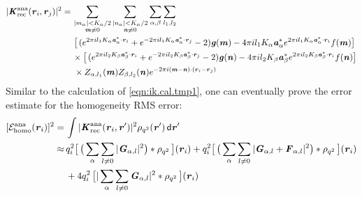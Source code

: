 \documentclass[aps,pre,preprint]{revtex4}
\renewcommand{\v}[1]{\textbf{\textit{#1}}}
\renewcommand{\d}[1]{\textsf{#1}}
\begin{document}
\begin{align}
  \vert\v K^{\textrm{ana}}_{\textrm{rec}}(\v r_i,\v r_j)\vert^2
  =\,&
  \sum_{
    \begin{subarray}{c}
      \vert m_{\alpha}\vert < K_\alpha/2\\
      \v m\neq 0
    \end{subarray}}
  \sum_{
    \begin{subarray}{c}
      \vert n_{\alpha}\vert < K_\alpha/2\\
      \v n\neq 0
    \end{subarray}}
  \sum_{\alpha,\beta}
  \sum_{l_1,l_2}
  \\\nonumber
  &\,
  \big[
  \,(
  e^{2\pi i l_1 K_\alpha\v a^\ast_\alpha\cdot \v r_i} +
  e^{-2\pi i l_1 K_\alpha\v a^\ast_\alpha\cdot \v r_j}
  - 2
  )
  \v g(\v m)
  - 4\pi i l_1 K_\alpha\v a_\alpha^\ast e^{2\pi i l_1 K_\alpha\v a^\ast_\alpha\cdot \v r_i}
  f(\v m)
  \big] \\\nonumber
  \,&
  \times
  \big[
  \,(
  e^{2\pi i l_2 K_\beta\v a^\ast_\beta\cdot \v r_i} +
  e^{-2\pi i l_2 K_\beta\v a^\ast_\beta\cdot \v r_j}
  - 2
  )
  \v g(\v n)
  - 4\pi i l_2 K_\beta\v a_\beta^\ast e^{2\pi i l_2 K_\beta\v a^\ast_\beta\cdot \v r_i}
  f(\v n)
  \big]
  \\
  &\,
  \times
  Z_{\alpha,l_1}(\v m)Z_{\beta,l_2}(\v n)
  e^{-2\pi i(\v m-\v n)\cdot(\v r_i-\v r_j)}
\end{align}
Similar to the calculation of \eqref{eqn:ik.cal.tmp1}, one can eventually
prove the error estimate for the homogeneity RMS error:
\begin{align}\nonumber
  [\mathcal E^{\textrm{ana}}_{\textrm{homo}}(\v r_i)]^2
  = \,&
  \int
  \vert\v K^{\textrm{ana}}_{\textrm{rec}}(\v r_i,\v r')\vert^2
  \rho_{q^2}(\v r')\,\d d\v r' \\\nonumber
  \approx\,&  
  q_i^2
  \big[\,
  \big(
  \sum_{\alpha} \sum_{l\neq 0}
  \vert \v G_{\alpha,l}\vert^2
  \big)
  \ast \rho_{q^2}
  \,\big] (\v r_i) +
  q_i^2
  \big[\,
  \big(
  \sum_{\alpha} \sum_{l\neq 0}
  \vert \v G_{\alpha,l} +\v F_{\alpha,l}\vert^2
  \big)
  \ast \rho_{q^2}
  \,\big] (\v r_i) \\
  \,&+
  4q_i^2\,
  \big[
  \vert
  \sum_{\alpha} \sum_{l\neq 0}  
  \v G_{\alpha,l}
  \vert^2
  \ast \rho_{q^2}\,
  \big] (\v r_i) 
\end{align}
\end{document}
